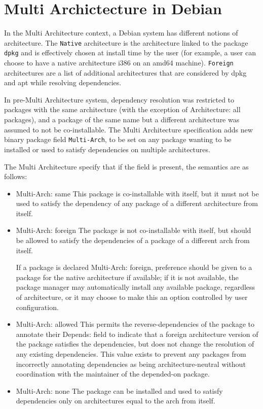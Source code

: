 \section{Multi Archictecture in Debian}

In the Multi Architecture context, a Debian system has different notions of
architecture. The \texttt{Native} architecture is the architecture linked to
the package \texttt{dpkg} and is effectively chosen at install time by the user
(for example, a user can choose to have a native architecture i386 on an amd64
machine). \texttt{Foreign} architectures are a list of additional
architectures that are considered by dpkg and apt while resolving dependencies. 

In pre-Multi Architecture system, dependency resolution was restricted to
packages with the same architecture (with the exception of Architecture: all
packages), and a package of the same name but a different architecture was
assumed to not be co-installable. The Multi Architecture specification adds new
binary package field \texttt{Multi-Arch}, to be set on any package wanting to
be installed or used to satisfy dependencies on multiple architectures.

The Multi Architecture specify that if the field is present, the semantics are as follows:

\begin{itemize}
  \item{Multi-Arch: same} This package is co-installable with itself,
    but it must not be used to satisfy the dependency of any package
    of a different architecture from itself. 
  \item{Multi-Arch: foreign} The package is not co-installable with
    itself, but should be allowed to satisfy the dependencies of a
    package of a different arch from itself.

    If a package is declared Multi-Arch: foreign, preference should be
    given to a package for the native architecture if available; if it
    is not available, the package manager may automatically install
    any available package, regardless of architecture, or it may
    choose to make this an option controlled by user configuration. 
  \item{Multi-Arch: allowed} This permits the reverse-dependencies of
    the package to annotate their Depends: field to indicate that a
    foreign architecture version of the package satisfies the
    dependencies, but does not change the resolution of any existing
    dependencies. This value exists to prevent any packages from
    incorrectly annotating dependencies as being architecture-neutral
    without coordination with the maintainer of the depended-on
    package. 
  \item{Multi-Arch: none}
    The package can be installed and used to satisfy dependencies only
    on architectures equal to the arch from itself.
\end{itemize}

